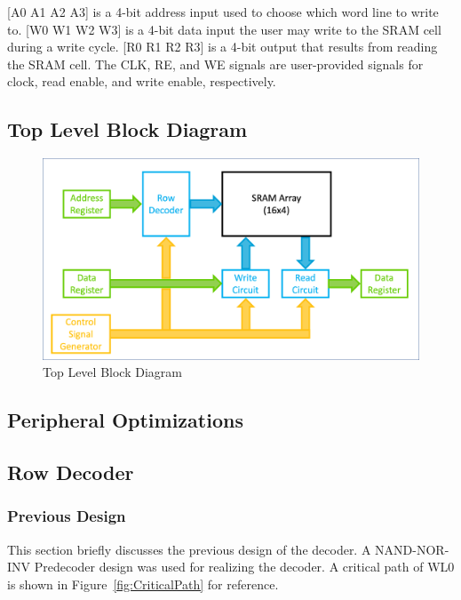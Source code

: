 \documentclass[10pt,letterpaper,onecolumn]{article}
\begin{document}
[A0 A1 A2 A3] is a 4-bit address input used to choose which word line to write to. [W0 W1 W2 W3] is a 4-bit data input the user may write to the SRAM cell during a write cycle. [R0 R1 R2 R3] is a 4-bit output that results from reading the SRAM cell. The CLK, RE, and WE signals are user-provided signals for clock, read enable, and write enable, respectively.

\subsection{Top Level Block Diagram}
\begin{figure}[h!]
    \centering
    \includegraphics[clip,width=\columnwidth]{top_level_block.png}
    \caption{Top Level Block Diagram}
    \label{fig:top_level_block}
\end{figure}

\clearpage
\begin{center}
\section{Peripheral Optimizations}
\end{center}

\subsection{Row Decoder}

\subsubsection{Previous Design}

This section briefly discusses the previous design of the decoder. A NAND-NOR-INV Predecoder design was used for realizing the decoder. A critical path of WL0 is shown in Figure~\ref{fig:CriticalPath} for reference. 
\end{document}
